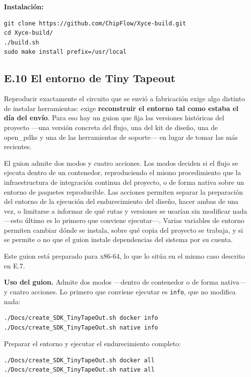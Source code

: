 \textbf{Instalación:}

\begin{verbatim}
git clone https://github.com/ChipFlow/Xyce-build.git
cd Xyce-build/
./build.sh
sudo make install prefix=/usr/local
\end{verbatim}

\subsection{E.10 El entorno de Tiny
Tapeout}\label{e.10-el-entorno-de-tiny-tapeout}

Reproducir exactamente el circuito que se envió a fabricación exige algo
distinto de instalar herramientas: exige \textbf{reconstruir el entorno
tal como estaba el día del envío}. Para eso hay un guion que fija las
versiones históricas del proyecto ---una versión concreta del flujo, una
del kit de diseño, una de open\_pdks y una de las herramientas de
soporte--- en lugar de tomar las más recientes.

El guion admite dos modos y cuatro acciones. Los modos deciden si el
flujo se ejecuta dentro de un contenedor, reproduciendo el mismo
procedimiento que la infraestructura de integración continua del
proyecto, o de forma nativa sobre un entorno de paquetes reproducible.
Las acciones permiten separar la preparación del entorno de la ejecución
del endurecimiento del diseño, hacer ambas de una vez, o limitarse a
informar de qué rutas y versiones se usarían sin modificar nada ---esto
último es lo primero que conviene ejecutar---. Varias variables de
entorno permiten cambiar dónde se instala, sobre qué copia del proyecto
se trabaja, y si se permite o no que el guion instale dependencias del
sistema por su cuenta.

Este guion está preparado para x86-64, lo que lo sitúa en el mismo caso
descrito en E.7.

\textbf{Uso del guion.} Admite dos modos ---dentro de contenedor o de
forma nativa--- y cuatro acciones. Lo primero que conviene ejecutar es
\texttt{info}, que no modifica nada:

\begin{verbatim}
./Docs/create_SDK_TinyTapeOut.sh docker info
./Docs/create_SDK_TinyTapeOut.sh native info
\end{verbatim}

Preparar el entorno y ejecutar el endurecimiento completo:

\begin{verbatim}
./Docs/create_SDK_TinyTapeOut.sh docker all
./Docs/create_SDK_TinyTapeOut.sh native all
\end{verbatim}

